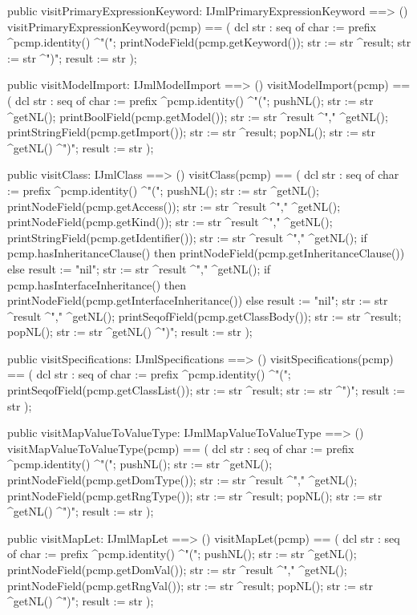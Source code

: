 \begin{vdm_al}
  public visitPrimaryExpressionKeyword: IJmlPrimaryExpressionKeyword ==> ()
  visitPrimaryExpressionKeyword(pcmp) ==
    ( dcl str : seq of char := prefix ^pcmp.identity() ^"(";
      printNodeField(pcmp.getKeyword());
      str := str ^result;
      str := str ^")";
      result := str );

  public visitModelImport: IJmlModelImport ==> ()
  visitModelImport(pcmp) ==
    ( dcl str : seq of char := prefix ^pcmp.identity() ^"(";
      pushNL();
      str := str ^getNL();
      printBoolField(pcmp.getModel());
      str := str ^result ^"," ^getNL();
      printStringField(pcmp.getImport());
      str := str ^result;
      popNL();
      str := str ^getNL() ^")";
      result := str );

  public visitClass: IJmlClass ==> ()
  visitClass(pcmp) ==
    ( dcl str : seq of char := prefix ^pcmp.identity() ^"(";
      pushNL();
      str := str ^getNL();
      printNodeField(pcmp.getAccess());
      str := str ^result ^"," ^getNL();
      printNodeField(pcmp.getKind());
      str := str ^result ^"," ^getNL();
      printStringField(pcmp.getIdentifier());
      str := str ^result ^"," ^getNL();
      if pcmp.hasInheritanceClause()
      then printNodeField(pcmp.getInheritanceClause())
      else result := "nil";
      str := str ^result ^"," ^getNL();
      if pcmp.hasInterfaceInheritance()
      then printNodeField(pcmp.getInterfaceInheritance())
      else result := "nil";
      str := str ^result ^"," ^getNL();
      printSeqofField(pcmp.getClassBody());
      str := str ^result;
      popNL();
      str := str ^getNL() ^")";
      result := str );

  public visitSpecifications: IJmlSpecifications ==> ()
  visitSpecifications(pcmp) ==
    ( dcl str : seq of char := prefix ^pcmp.identity() ^"(";
      printSeqofField(pcmp.getClassList());
      str := str ^result;
      str := str ^")";
      result := str );

  public visitMapValueToValueType: IJmlMapValueToValueType ==> ()
  visitMapValueToValueType(pcmp) ==
    ( dcl str : seq of char := prefix ^pcmp.identity() ^"(";
      pushNL();
      str := str ^getNL();
      printNodeField(pcmp.getDomType());
      str := str ^result ^"," ^getNL();
      printNodeField(pcmp.getRngType());
      str := str ^result;
      popNL();
      str := str ^getNL() ^")";
      result := str );

  public visitMapLet: IJmlMapLet ==> ()
  visitMapLet(pcmp) ==
    ( dcl str : seq of char := prefix ^pcmp.identity() ^"(";
      pushNL();
      str := str ^getNL();
      printNodeField(pcmp.getDomVal());
      str := str ^result ^"," ^getNL();
      printNodeField(pcmp.getRngVal());
      str := str ^result;
      popNL();
      str := str ^getNL() ^")";
      result := str );


\end{vdm_al}
